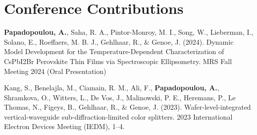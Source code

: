 \section*{Conference Contributions}

\textbf{Papadopoulou, A.}, Saha, R. A., Pintor-Monroy, M. I., Song, W., Lieberman, I., Solano, E., Roeffaers, M. B. J., Gehlhaar, R., \& Genoe, J. (2024). Dynamic Model Development for the Temperature-Dependent Characterization of CsPbI2Br Perovskite Thin Films via Spectroscopic Ellipsometry. MRS Fall Meeting 2024 (Oral Presentation)


Kang, S., Benelajla, M., Ciamain, R. M., Ali, F., \textbf{Papadopoulou, A.}, Shramkova, O., Witters, L., De Vos, J., Malinowski, P. E., Heremans, P., Le Thomas, N., Figeys, B., Gehlhaar, R., \& Genoe, J. (2023). Wafer-level-integrated vertical-waveguide sub-diffraction-limited color splitters. 2023 International Electron Devices Meeting (IEDM), 1–4.



\cleardoublepage

